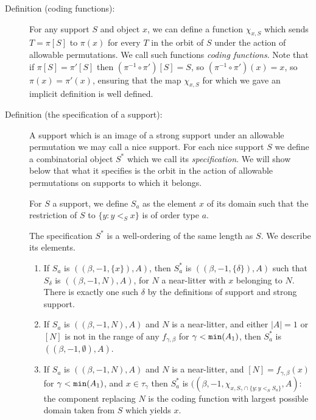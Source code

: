 \documentclass[112pt]{article}
\begin{document}
\begin{description}

\item[Definition (coding functions):]  For any support $S$ and object $x$, we can define a function $\chi_{x,S}$ which sends $T=\pi[S]$ to $\pi(x)$ for every $T$ in the orbit of $S$ under
the action of allowable permutations.  We call such functions {\em coding functions\/}.  Note that if $\pi[S]=\pi'[S]$ then $(\pi^{-1}\circ \pi')[S]= S$, so 
$(\pi^{-1}\circ \pi')(x)= x$, so $\pi(x)=\pi'(x)$, ensuring that the map $\chi_{x,S}$ for which we gave an implicit definition is well defined.

\item[Definition (the specification of a support):]  A support which is an image of a strong support under an allowable permutation we may call a nice support.  For each nice support $S$ we define a combinatorial object $S^*$ which we call its {\em specification\/}.  We will show below that what it specifies is the orbit in the action of allowable permutations on supports to which it belongs.

For $S$ a support, we define $S_a$ as the element $x$ of its domain such that the restriction of $S$ to $\{y:y <_S x\}$ is of order type $a$.

The specification $S^*$ is a well-ordering of the same length as $S$.  We describe its elements.

\begin{enumerate}

\item  If $S_{a}$ is $((\beta,-1,\{x\}),A)$, then $S^*_a$ is $((\beta,-1,\{\delta\}),A)$ such that $S_\delta$ is $((\beta,-1,N),A)$, for $N$ a near-litter with $x$ belonging to $N$.  There is exactly one such $\delta$ by the definitions of support and strong support.

\item  If $S_a$ is $((\beta,-1,N),A)$ and $N$ is a near-litter, and either $|A|=1$ or $[N]$ is not in the range of any $f_{\gamma,\beta}$ for $\gamma<{\tt min}(A_1)$, then $S^*_a$ is $((\beta,-1,\emptyset),A)$.

\item  If $S_a$ is $((\beta,-1,N),A)$ and $N$ is a near-litter, and $[N]=f_{\gamma,\beta}(x)$ for $\gamma<{\tt min}(A_1)$, and $x\in \tau_\gamma$ then 
$S^*_a$ is $((\beta,-1,\chi_{x,S_{\gamma}\cap \{y:y <_S S_a\}},A)$:  the component replacing $N$ is the coding function with largest possible domain taken from $S$ which yields $x$.


\end{enumerate}
\end{description}
\end{document}
